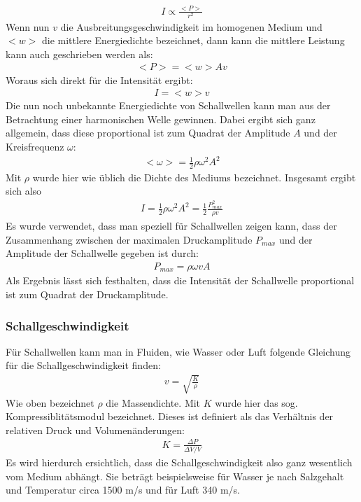 \documentclass[12pt,a4paper,titlepage,headinclude,bibtotoc]{scrartcl}
\begin{document}
\begin{align}
 I \propto \frac{<P>}{r^2}
\end{align}
Wenn nun $v$ die Ausbreitungsgeschwindigkeit im homogenen Medium und $<w>$ die mittlere Energiedichte bezeichnet, dann kann die mittlere Leistung kann auch geschrieben werden als:
\begin{align}
 <P>  = <w> A v
\end{align}
Woraus sich direkt für die Intensität ergibt:
\begin{align}
 I = <w> v
\end{align}
Die nun noch unbekannte Energiedichte von Schallwellen kann man aus der Betrachtung einer harmonischen Welle gewinnen. Dabei ergibt sich ganz allgemein, dass diese 
proportional ist zum Quadrat der Amplitude $A$ und der Kreisfrequenz $\omega$:
\begin{align}
 <\omega> = \frac{1}{2} \rho \omega^2 A^2
\end{align}
Mit $\rho$ wurde hier wie üblich die Dichte des Mediums bezeichnet.
Insgesamt ergibt sich also 
\begin{align}
 I = \frac{1}{2} \rho \omega^2 A^2 = \frac{1}{2} \frac{P_{max}^2}{\rho v}  
\end{align}
Es wurde verwendet, dass man speziell für Schallwellen zeigen kann, dass der Zusammenhang zwischen der maximalen Druckamplitude $P_{max}$ und der Amplitude der Schallwelle gegeben ist durch:
\begin{align}
 P_{max} = \rho \omega v A
\end{align}
Als Ergebnis lässt sich festhalten, dass die Intensität der Schallwelle proportional ist zum Quadrat der Druckamplitude.

\subsubsection{Schallgeschwindigkeit}
Für Schallwellen kann man in Fluiden, wie Wasser oder Luft folgende Gleichung für die Schallgeschwindigkeit finden:
\begin{align}
 v = \sqrt{  \frac{K}{\rho}  }
\end{align}
Wie oben bezeichnet $\rho$ die Massendichte. Mit $K$ wurde hier das sog. Kompressiblitätsmodul bezeichnet. Dieses ist definiert als das Verhältnis der relativen Druck und Volumenänderungen:
\begin{align}
 K =  \frac{\Delta P}{\Delta V / V }
\end{align}
Es wird hierdurch ersichtlich, dass die Schallgeschwindigkeit also ganz wesentlich vom Medium abhängt. 
Sie beträgt beispielsweise für Wasser je nach Salzgehalt und Temperatur circa 1500 m/s  und für Luft 340 m/s.
\end{document}
